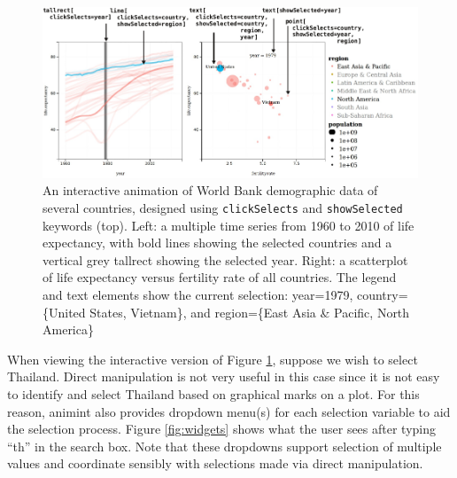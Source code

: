 \documentclass[12pt,]{isuthesis}
\begin{document}
\begin{figure}[htbp]
\centering
\includegraphics{images/figure-1.pdf}
\caption{\label{fig:worldbank}An interactive animation of World Bank
demographic data of several countries, designed using
\texttt{clickSelects} and \texttt{showSelected} keywords (top). Left: a
multiple time series from 1960 to 2010 of life expectancy, with bold
lines showing the selected countries and a vertical grey tallrect
showing the selected year. Right: a scatterplot of life expectancy
versus fertility rate of all countries. The legend and text elements
show the current selection: year=1979, country= \{United States,
Vietnam\}, and region=\{East Asia \& Pacific, North America\}}
\end{figure}

When viewing the interactive version of Figure \ref{fig:worldbank},
suppose we wish to select Thailand. Direct manipulation is not very
useful in this case since it is not easy to identify and select Thailand
based on graphical marks on a plot. For this reason, animint also
provides dropdown menu(s) for each selection variable to aid the
selection process. Figure \ref{fig:widgets} shows what the user sees
after typing ``th'' in the search box. Note that these dropdowns support
selection of multiple values and coordinate sensibly with selections
made via direct manipulation.
\end{document}

